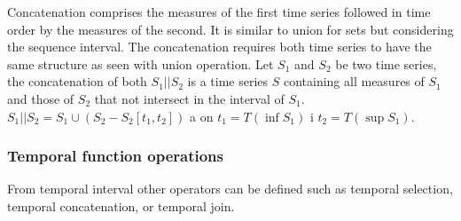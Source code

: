 Concatenation comprises the measures of the first time series followed
in time order by the measures of the second. It is similar to union
for sets but considering the sequence interval. The concatenation
requires both time series to have the same structure as seen with
union operation.  Let $S_1$ and $S_2$ be two time series, the
concatenation of both $S_1 || S_2$ is a time series $S$ containing all
measures of $S_1$ and those of $S_2$ that not intersect in the
interval of $S_1$.  $S_1 || S_2 = S_1 \cup ( S_2 - S_2[t_1,t_2] )$ a
on $t_1=T(\inf S_1)$ i $t_2=T(\sup S_1)$.




\subsubsection{Temporal function operations}


From temporal interval other operators can be defined such as temporal
selection, temporal concatenation, or temporal join.


\todo{}











